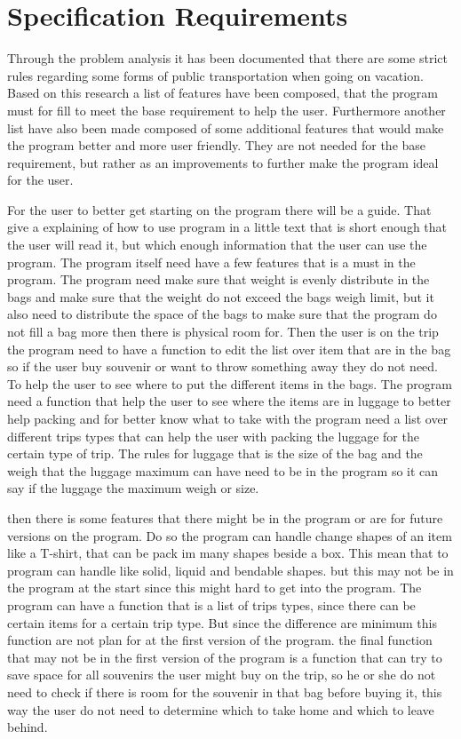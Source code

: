 \section{Specification Requirements}
\label{sec:Spec}
Through the problem analysis it has been documented that there are some strict rules regarding some forms of public transportation when going on vacation. Based on this research a list of features have been composed, that the program must for fill to meet the base requirement to help the user.
Furthermore another list have also been made composed of some additional features that would make the program better and more user friendly. They are not needed for the base requirement, but rather as an improvements to further make the program ideal for the user.

For the user to better get starting on the program there will be a guide. That give a explaining of how to use program in a little text that is short enough that the user will read it, but which enough information that the user can use the program.
The program itself need have a few features that is a must in the program. The program need make sure that weight is evenly distribute in the bags and make sure that the weight do not exceed the bags weigh limit, but it also need to distribute the space of the bags to make sure that the program do not fill a bag more then there is physical room for.
Then the user is on the trip the program need to have a function to edit the list over item that are in the bag so if the user buy souvenir or want to throw something away they do not need.
To help the user to see where to put the different items in the bags. The program need a function that help the user to see where the items are in luggage to better help packing and for better know what to take with the program need a list over different trips types that can help the user with packing the luggage for the certain type of trip.
The rules for luggage that is the size of the bag and the weigh that the luggage maximum can have need to be in the program so it can say if the luggage the maximum weigh or size.


then there is some features that there might be in the program or are for future versions on the program. Do so the program can handle change shapes of an item like a T-shirt, that can be pack im many shapes beside a box. This mean that to program can handle like solid, liquid and bendable shapes. but this may not be in the program at the start since this might hard to get into the program.
The program can have a function that is a list of trips types, since there can be certain items for a certain trip type. But since the difference are minimum this function are not plan for at the first version of the program.
the final function that may not be in the first version of the program is a function that can try to save space for all souvenirs the user might buy on the trip, so he or she do not need to check if there is room for the souvenir in that bag before buying it, this way the user do not need to determine which to take home and which to leave behind.

